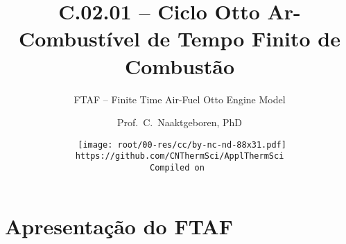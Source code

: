 \makeatletter
\immediate{} %
\makeatother



\title{C.02.01 -- Ciclo Otto Ar-Combustível de Tempo Finito de Combustão}
\subtitle{FTAF -- Finite Time Air-Fuel Otto Engine Model}
\author{Prof.~C.~Naaktgeboren, PhD}
\date{{\scriptsize\tt%
    \texttt{[image: root/00-res/cc/by-nc-nd-88x31.pdf]}\\[\smallskipamount]
    https://github.com/CNThermSci/ApplThermSci\\
    Compiled on 
}}

\frame{\titlepage}

\section{Apresentação do FTAF}

